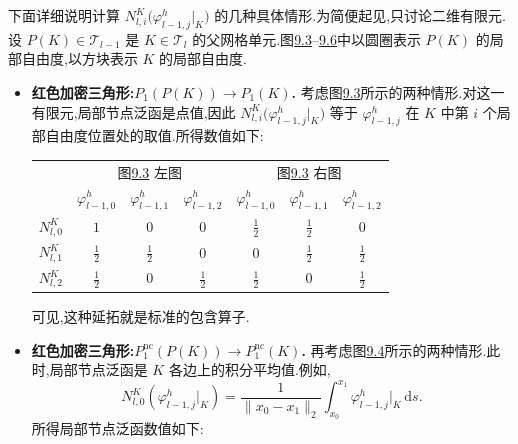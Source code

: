 \begin{example}[(局部泛函的计算)]
\label{ex:chapter9-local-functional-evaluation}
下面详细说明计算 $N_{l,i}^K\bigl(\varphi_{l-1,j}^h|_K\bigr)$ 的几种具体情形.为简便起见,只讨论二维有限元.设 $P(K)\in\mathcal T_{l-1}$ 是 $K\in\mathcal T_l$ 的父网格单元.图\hyperref[fig:chapter9-red-refined-p1]{9.3}--\hyperref[fig:chapter9-rotated-q1-q2]{9.6}中以圆圈表示 $P(K)$ 的局部自由度,以方块表示 $K$ 的局部自由度.

\begin{itemize}
\item \textbf{红色加密三角形:$P_1(P(K))\to P_1(K)$.} 考虑图\hyperref[fig:chapter9-red-refined-p1]{9.3}所示的两种情形.对这一有限元,局部节点泛函是点值,因此 $N_{l,i}^K\bigl(\varphi_{l-1,j}^h|_K\bigr)$ 等于 $\varphi_{l-1,j}^h$ 在 $K$ 中第 $i$ 个局部自由度位置处的取值.所得数值如下:

\begin{eleganttable}[0.84\linewidth]
\centering
\scriptsize
\setlength{\tabcolsep}{4pt}
\renewcommand{\arraystretch}{1.08}
\begin{tabular}{c|ccc|ccc}
\multicolumn{1}{c}{} & \multicolumn{3}{c|}{图\hyperref[fig:chapter9-red-refined-p1]{9.3} 左图} & \multicolumn{3}{c}{图\hyperref[fig:chapter9-red-refined-p1]{9.3} 右图}\\
 & $\varphi_{l-1,0}^h$ & $\varphi_{l-1,1}^h$ & $\varphi_{l-1,2}^h$ & $\varphi_{l-1,0}^h$ & $\varphi_{l-1,1}^h$ & $\varphi_{l-1,2}^h$\\
\hline
$N_{l,0}^K$ & $1$ & $0$ & $0$ & $\tfrac12$ & $\tfrac12$ & $0$\\
$N_{l,1}^K$ & $\tfrac12$ & $\tfrac12$ & $0$ & $0$ & $\tfrac12$ & $\tfrac12$\\
$N_{l,2}^K$ & $\tfrac12$ & $0$ & $\tfrac12$ & $\tfrac12$ & $0$ & $\tfrac12$\\
\end{tabular}
\end{eleganttable}

可见,这种延拓就是标准的包含算子.

\item \textbf{红色加密三角形:$P_1^{\mathrm{nc}}(P(K))\to P_1^{\mathrm{nc}}(K)$.} 再考虑图\hyperref[fig:chapter9-red-refined-p1-nc]{9.4}所示的两种情形.此时,局部节点泛函是 $K$ 各边上的积分平均值.例如,
\[
 N_{l,0}^K\!\left(\varphi_{l-1,j}^h|_K\right)
 =\frac{1}{\|x_0-x_1\|_2}
   \int_{x_0}^{x_1}\varphi_{l-1,j}^h|_K\,\mathrm ds.
\]
所得局部节点泛函数值如下:


\end{itemize}
\end{example}
